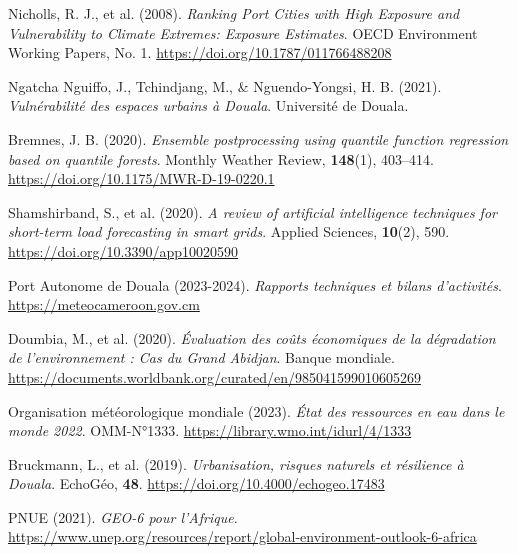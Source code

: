 \documentclass[a4paper,12pt,openany]{report}
\begin{document}






\begin{thebibliography}{99}
	
	Nicholls, R. J., et al. (2008).
	\textit{Ranking Port Cities with High Exposure and Vulnerability to Climate Extremes: Exposure Estimates}.
	OECD Environment Working Papers, No. 1. \url{https://doi.org/10.1787/011766488208}
	
	Ngatcha Nguiffo, J., Tchindjang, M., \& Nguendo-Yongsi, H. B. (2021).
	\textit{Vulnérabilité des espaces urbains à Douala}.
	Université de Douala.
	
	Bremnes, J. B. (2020).
	\textit{Ensemble postprocessing using quantile function regression based on quantile forests}.
	Monthly Weather Review, \textbf{148}(1), 403–414. \url{https://doi.org/10.1175/MWR-D-19-0220.1}
	
	Shamshirband, S., et al. (2020).
	\textit{A review of artificial intelligence techniques for short-term load forecasting in smart grids}.
	Applied Sciences, \textbf{10}(2), 590. \url{https://doi.org/10.3390/app10020590}
	
	Port Autonome de Douala (2023-2024).
	\textit{Rapports techniques et bilans d'activités}. \url{https://meteocameroon.gov.cm}
	
	Doumbia, M., et al. (2020).
	\textit{Évaluation des coûts économiques de la dégradation de l'environnement : Cas du Grand Abidjan}.
	Banque mondiale. \url{https://documents.worldbank.org/curated/en/985041599010605269}
	
	Organisation météorologique mondiale (2023).
	\textit{État des ressources en eau dans le monde 2022}.
	OMM-N°1333. \url{https://library.wmo.int/idurl/4/1333}
	
	Bruckmann, L., et al. (2019).
	\textit{Urbanisation, risques naturels et résilience à Douala}.
	EchoGéo, \textbf{48}. \url{https://doi.org/10.4000/echogeo.17483}
	
	PNUE (2021).
	\textit{GEO-6 pour l'Afrique}.
	\url{https://www.unep.org/resources/report/global-environment-outlook-6-africa}
	

\end{thebibliography}
\end{document}
